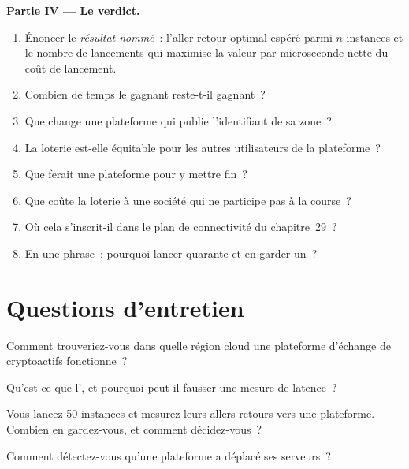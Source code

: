\begin{problem}
\medskip\noindent\textbf{Partie IV --- Le verdict.}
\begin{enumerate}[resume]
\item Énoncer le \emph{résultat nommé}~: l'aller-retour optimal espéré parmi $n$ instances et le nombre de lancements qui maximise la valeur par microseconde nette
  du coût de lancement.
\item Combien de temps le gagnant reste-t-il gagnant~?
\item Que change une plateforme qui publie l'identifiant de sa zone~?
\item La loterie est-elle équitable pour les autres utilisateurs de la plateforme~?
\item Que ferait une plateforme pour y mettre fin~?
\item Que coûte la loterie à une société qui ne participe pas à la course~?
\item Où cela s'inscrit-il dans le plan de connectivité du chapitre~29~?
\item En une phrase~: pourquoi lancer quarante et en garder un~?
\end{enumerate}
\end{problem}

\section{Questions d'entretien}

\begin{interviewq}\label{iq:nw:where-the-crypto-venues-live:1}
Comment trouveriez-vous dans quelle région cloud une plateforme d'échange de cryptoactifs fonctionne~?
\end{interviewq}

\begin{interviewq}\label{iq:nw:where-the-crypto-venues-live:2}
Qu'est-ce que l', et pourquoi peut-il fausser une mesure de latence~?
\end{interviewq}

\begin{interviewq}\label{iq:nw:where-the-crypto-venues-live:3}
Vous lancez 50 instances et mesurez leurs allers-retours vers une plateforme. Combien en gardez-vous, et comment décidez-vous~?
\end{interviewq}

\begin{interviewq}\label{iq:nw:where-the-crypto-venues-live:4}
Comment détectez-vous qu'une plateforme a déplacé ses serveurs~?
\end{interviewq}


